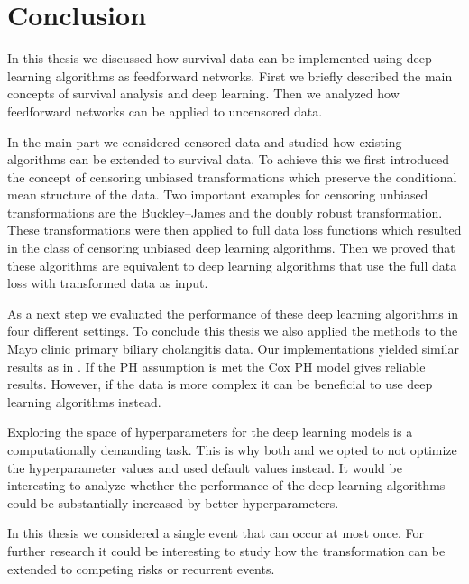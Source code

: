 \documentclass[12pt, a4paper]{scrartcl}
\theoremstyle{definition}
\theoremstyle{plain}
\numberwithin{equation}{section}
\numberwithin{figure}{section}
\numberwithin{table}{section}
\begin{document}
	\newpage
	
	\section{Conclusion}
	In this thesis we discussed how survival data can be implemented using deep learning algorithms as feedforward networks.
	First we briefly described the main concepts of survival analysis and deep learning.
	Then we analyzed how feedforward networks can be applied to uncensored data.
	
	In the main part we considered censored data and studied how existing algorithms can be extended to survival data.
	To achieve this we first introduced the concept of censoring unbiased transformations which preserve the conditional mean structure of the data.
	Two important examples for censoring unbiased transformations are the Buckley--James and the doubly robust transformation.
	These transformations were then applied to full data loss functions which resulted in the class of censoring unbiased deep learning algorithms.
	Then we proved that these algorithms are equivalent to deep learning algorithms that use the full data loss with transformed data as input.
	
	As a next step we evaluated the performance of these deep learning algorithms in four different settings.
	To conclude this thesis we also applied the methods to the Mayo clinic primary biliary cholangitis data.
	Our implementations yielded similar results as in \citet*{basearticle}.
	If the PH assumption is met the Cox PH model gives reliable results.
	However, if the data is more complex it can be beneficial to use deep learning algorithms instead.
	
	Exploring the space of hyperparameters for the deep learning models is a computationally demanding task.
	This is why both \citet*{basearticle} and we opted to not optimize the hyperparameter values and used default values instead.
	It would be interesting to analyze whether the performance of the deep learning algorithms could be substantially increased by better hyperparameters.
	
	In this thesis we considered a single event that can occur at most once.
	For further research it could be interesting to study how the transformation can be extended to competing risks or recurrent events.
	
	\newpage
	
	\thispagestyle{empty}
	
	
	
\end{document}
